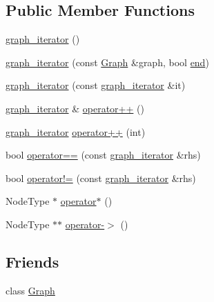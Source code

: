 \subsection*{Public Member Functions}
\begin{DoxyCompactItemize}
\item 
\mbox{\hyperlink{classGraph_1_1graph__iterator_a8b196d38303d26eed7e4dff770ca5afe}{graph\+\_\+iterator}} ()
\item 
\mbox{\hyperlink{classGraph_1_1graph__iterator_a366ad38669a4391ec3bfa8b1272fe4df}{graph\+\_\+iterator}} (const \mbox{\hyperlink{classGraph}{Graph}} \&graph, bool \mbox{\hyperlink{classGraph_a020a70df87cde34c893bf4b7664fc94c}{end}})
\item 
\mbox{\hyperlink{classGraph_1_1graph__iterator_a00adcee70789e661ca2398e9d2e18500}{graph\+\_\+iterator}} (const \mbox{\hyperlink{classGraph_1_1graph__iterator}{graph\+\_\+iterator}} \&it)
\item 
\mbox{\hyperlink{classGraph_1_1graph__iterator}{graph\+\_\+iterator}} \& \mbox{\hyperlink{classGraph_1_1graph__iterator_af1cda6db31e1537468cf9f01436572e5}{operator++}} ()
\item 
\mbox{\hyperlink{classGraph_1_1graph__iterator}{graph\+\_\+iterator}} \mbox{\hyperlink{classGraph_1_1graph__iterator_a966ec3cb771fcc491094e5111ecaf68c}{operator++}} (int)
\item 
bool \mbox{\hyperlink{classGraph_1_1graph__iterator_ad3519806dff27934c5f07b749b0ac17a}{operator==}} (const \mbox{\hyperlink{classGraph_1_1graph__iterator}{graph\+\_\+iterator}} \&rhs)
\item 
bool \mbox{\hyperlink{classGraph_1_1graph__iterator_a76d8ed147d8028d4cb71bd0075ca018d}{operator!=}} (const \mbox{\hyperlink{classGraph_1_1graph__iterator}{graph\+\_\+iterator}} \&rhs)
\item 
Node\+Type $\ast$ \mbox{\hyperlink{classGraph_1_1graph__iterator_aa642c15bd744068df49da9c291ff2d26}{operator$\ast$}} ()
\item 
Node\+Type $\ast$$\ast$ \mbox{\hyperlink{classGraph_1_1graph__iterator_aba0a581abc84f3dd8dccb2bc5842628d}{operator-\/$>$}} ()
\end{DoxyCompactItemize}
\subsection*{Friends}
\begin{DoxyCompactItemize}
\item 
class \mbox{\hyperlink{classGraph_1_1graph__iterator_afab89afd724f1b07b1aaad6bdc61c47a}{Graph}}
\end{DoxyCompactItemize}


